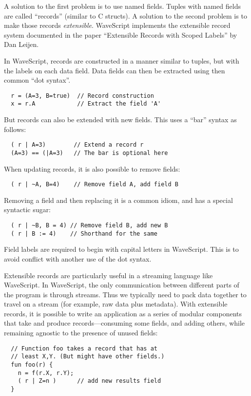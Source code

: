 \documentclass[twocolumn]{report}
\begin{document}
A solution to the first problem is to use named fields.  Tuples with
named fields are called ``records'' (similar to C structs).  A
solution to the second problem is to make those records {\em
extensible}.  WaveScript implements the extensible record system
documented in the paper ``Extensible Records with Scoped Labels'' by
Dan Leijen.

In WaveScript, records are constructed in a manner similar to tuples,
but with the labels on each data field.  Data fields can then be
extracted using then common ``dot syntax''.
\begin{verbatim}
  r = (A=3, B=true)  // Record construction
  x = r.A            // Extract the field 'A'
\end{verbatim}
But records can also be extended with new fields.  This uses a ``bar''
syntax as follows:
\begin{verbatim}
  ( r | A=3)        // Extend a record r
  (A=3) == (|A=3)   // The bar is optional here
\end{verbatim}

When updating records, it is also possible to remove fields:
\begin{verbatim}
  ( r | ~A, B=4)    // Remove field A, add field B
\end{verbatim}

Removing a field and then replacing it is a common idiom, and has
a special syntactic sugar:
\begin{verbatim}
  ( r | ~B, B = 4) // Remove field B, add new B
  ( r | B := 4)    // Shorthand for the same
\end{verbatim}

Field labels are required to begin with capital letters in WaveScript.
This is to avoid conflict with another use of the dot syntax.  

Extensible records are particularly useful in a streaming language
like WaveScript.  In WaveScript, the only communication between
different parts of the program is through streams.  Thus we typically
need to pack data together to travel on a stream (for example, raw
data plus metadata).  With extensible records, it is possible to write
an application as a series of modular components that take and produce
records---consuming some fields, and adding others, while remaining
agnostic to the presence of unused fields:
\begin{verbatim}
  // Function foo takes a record that has at 
  // least X,Y. (But might have other fields.)
  fun foo(r) {
    n = f(r.X, r.Y);
    ( r | Z=n )      // add new results field
  }
\end{verbatim}
\end{document}
